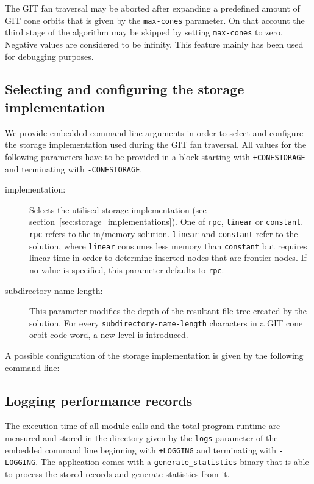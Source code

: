 The GIT fan traversal may be aborted after expanding a predefined amount of GIT cone orbits that is given by the \texttt{max-cones} parameter. On that account the third stage of the algorithm may be skipped by setting \texttt{max-cones} to zero. Negative values are considered to be infinity. This feature mainly has been used for debugging purposes.

\subsection*{Selecting and configuring the storage implementation}

We provide embedded command line arguments in order to select and configure the storage implementation used during the GIT fan traversal. All values for the following parameters have to be provided in a block starting with \texttt{+CONESTORAGE} and terminating with \texttt{-CONESTORAGE}.

\begin{description}
	\item[implementation:] Selects the utilised storage implementation (see section~\ref{sec:storage_implementations}). One of \texttt{rpc}, \texttt{linear} or \texttt{constant}. \texttt{rpc} refers to the in\=/memory solution. \texttt{linear} and \texttt{constant} refer to the \beegfs{} solution, where \texttt{linear} consumes less memory than \texttt{constant} but requires linear time in order to determine inserted nodes that are frontier nodes. If no value is specified, this parameter defaults to \texttt{rpc}.
	\item[subdirectory-name-length:] This parameter modifies the depth of the resultant file tree created by the \beegfs{} solution. For every \texttt{subdirectory-name-length} characters in a GIT cone orbit code word, a new level is introduced.
\end{description}

A possible configuration of the storage implementation is given by the following command line:


\subsection*{Logging performance records}

The execution time of all module calls and the total program runtime are measured and stored in the directory given by the \texttt{logs} parameter of the embedded command line beginning with \texttt{+LOGGING} and terminating with \texttt{-LOGGING}. The application comes with a \texttt{generate\_statistics} binary that is able to process the stored records and generate statistics from it.

